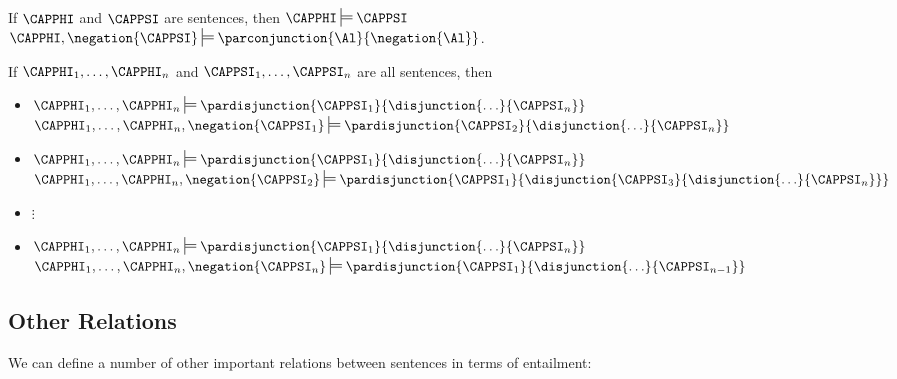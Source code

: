 \begin{THEOREM}
\begin{cenumerate}
\item If $\CAPPHI$ and $\CAPPSI$ are \GSL{} sentences, then $\CAPPHI\sdtstile{}{}\CAPPSI$ \Iff $\CAPPHI,\negation{\CAPPSI}\sdtstile{}{}\parconjunction{\Al}{\negation{\Al}}$.
\item If $\CAPPHI_1,\ldots,\CAPPHI_{\integer{n}}$ and $\CAPPSI_1,\ldots,\CAPPSI_{\integer{n}}$ are all \GSL{} sentences, then
\begin{itemize}
\item[] $\CAPPHI_1,\ldots,\CAPPHI_{\integer{n}}\sdtstile{}{}\pardisjunction{\CAPPSI_1}{\disjunction{\ldots}{\CAPPSI_{\integer{n}}}}$ \Iff $\CAPPHI_1,\ldots,\CAPPHI_{\integer{n}},\negation{\CAPPSI_1}\sdtstile{}{}\pardisjunction{\CAPPSI_2}{\disjunction{\ldots}{\CAPPSI_{\integer{n}}}}$
\item[] $\CAPPHI_1,\ldots,\CAPPHI_{\integer{n}}\sdtstile{}{}\pardisjunction{\CAPPSI_1}{\disjunction{\ldots}{\CAPPSI_{\integer{n}}}}$ \Iff $\CAPPHI_1,\ldots,\CAPPHI_{\integer{n}},\negation{\CAPPSI_2}\sdtstile{}{}\pardisjunction{\CAPPSI_1}{\disjunction{\CAPPSI_3}{\disjunction{\ldots}{\CAPPSI_{\integer{n}}}}}$
\item[] \hspace{1in} $\vdots$
\item[] $\CAPPHI_1,\ldots,\CAPPHI_{\integer{n}}\sdtstile{}{}\pardisjunction{\CAPPSI_1}{\disjunction{\ldots}{\CAPPSI_{\integer{n}}}}$ \Iff $\CAPPHI_1,\ldots,\CAPPHI_{\integer{n}},\negation{\CAPPSI_{\integer{n}}}\sdtstile{}{}\pardisjunction{\CAPPSI_1}{\disjunction{\ldots}{\CAPPSI_{n-1}}}$
\end{itemize} 
\end{cenumerate}
\end{THEOREM}

\subsection{Other Relations}\label{Other Relations}

We can define a number of other important relations between \GSL{} sentences in terms of entailment:

